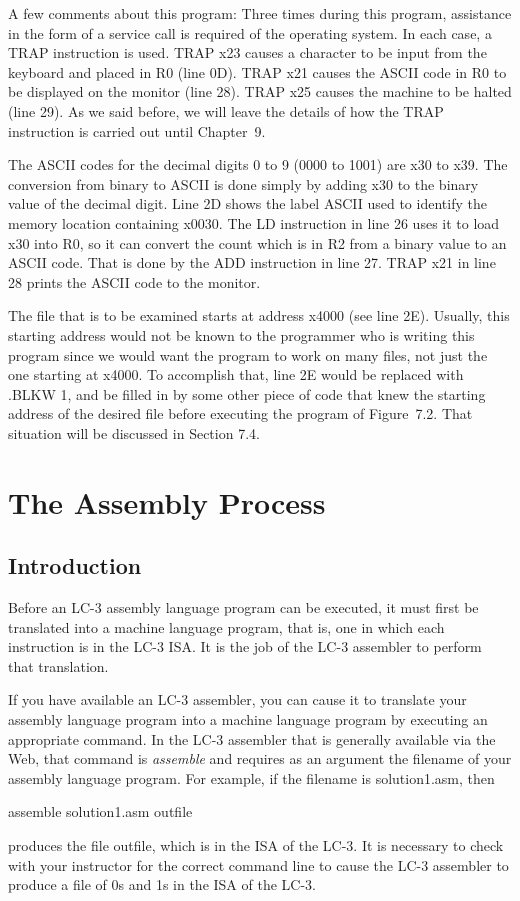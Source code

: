 \documentclass{patt}
\begin{document}
A few comments about this program: Three times during this program, 
assistance in the form of a service
call is required of the operating system.  In each case, a TRAP
instruction is used.  TRAP x23 causes a character to be input from the
keyboard and placed in R0 (line 0D).  TRAP x21 causes the ASCII code
in R0 to be displayed on the monitor (line 28).  TRAP x25 causes the
machine to be halted (line 29).  As we said before, we will leave the
details of how the TRAP instruction is carried out until Chapter~9.

The ASCII codes for the decimal digits 0 to 9 (0000 to 1001) are x30
to x39.  The conversion from binary to ASCII is done simply by adding
x30 to the binary value of the decimal digit.  Line 2D shows the label
ASCII used to identify the memory location containing x0030.  The LD
instruction in line 26 uses it to load x30 into R0, so it can convert
the count which is in R2 from a binary value to an ASCII code.  That is
done  by the ADD instruction in line 27.  TRAP x21 in line 28 prints 
the ASCII code to the monitor.

The file that is to be examined starts at address x4000 (see line 2E).
Usually, this starting address would not be known to the programmer
who is writing this program since we would want the program to work on
many files, not just the one starting at x4000.  To accomplish that,
line 2E would be replaced with .BLKW 1, and be filled in by some other
piece of code that knew the starting address of the desired file 
before executing the program of Figure~7.2.  That situation 
will be discussed in Section 7.4.

\vspace{-12pt}

\section{The Assembly Process}

\subsection{Introduction}

Before an LC-3 assembly language program can be executed, it must
first be translated into a machine language program, that is, one in
which each instruction is in the LC-3 ISA.  It is the job of the LC-3
assembler to perform that translation.

If you have available an LC-3 assembler, you can cause it to translate
your assembly language program into a machine language program by
executing an appropriate command.  In the LC-3 assembler that is
generally available via the Web, that command is {\em assemble} and
requires as an argument the filename of your assembly language
program.  For example, if the filename is solution1.asm, then
\begin{colorverbatim}
                 assemble solution1.asm outfile
\end{colorverbatim}
produces the file outfile, which is in the ISA of the LC-3.  It is
necessary to check with your instructor for the correct command line
to cause the LC-3 assembler to produce a file of 0s and 1s in the ISA
of the LC-3.
\end{document}
